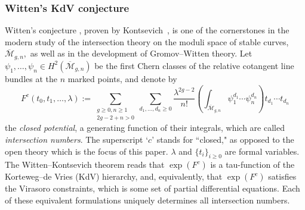 \documentclass[11pt]{amsart}
\theoremstyle{definition}
\theoremstyle{remark}
\newcommand{\<}{\left<}
\renewcommand{\>}{\right>}
\numberwithin{equation}{section}
\def\Mbar{{\overline{\mathcal M}}}
\begin{document}
\subsubsection{Witten's KdV conjecture}
Witten's %
conjecture \cite{Witten2DGravity}, proven by Kontsevich~\cite{Kontsevich}, is one of the cornerstones in the modern study of the intersection theory on the moduli space of %
stable curves,~$\Mbar_{g,n},$ %
as well as in the development of Gromov--Witten theory. Let $\psi_1, \ldots, \psi_n \in H^2(\Mbar_{g,n})$ be the first Chern classes of the relative cotangent line bundles at the $n$ marked points, and denote by
\[
F^c(t_0,t_1,\ldots,\lambda) := \sum_{\substack{g \geq 0, n\geq 1\\2g-2+n>0}} \sum_{d_1,\ldots,d_n\geq 0} \frac{\lambda^{2g-2}}{n!}\left(\int_{\Mbar_{g,n}} \psi_1^{d_1} \cdots \psi_n^{d_n} \right)t_{d_1} \cdots t_{d_n}
\]
the \emph{closed potential}, a generating function of their integrals, which are called \emph{intersection numbers}. The superscript `$c$' stands %
for ``closed," as %
opposed to the open theory which is the focus of this paper.  $\lambda$ and $\{t_i\}_{i\ge 0}$  are formal variables.  The Witten--Kontsevich theorem reads that $\exp(F^c)$ is a tau-function of the Korteweg--de Vries (KdV) %
hierarchy, and, equivalently, that %
$\exp(F^c)$ satisfies the Virasoro constraints, which is some set of partial differential equations. Each of these equivalent formulations uniquely determines all intersection numbers.
\end{document}
